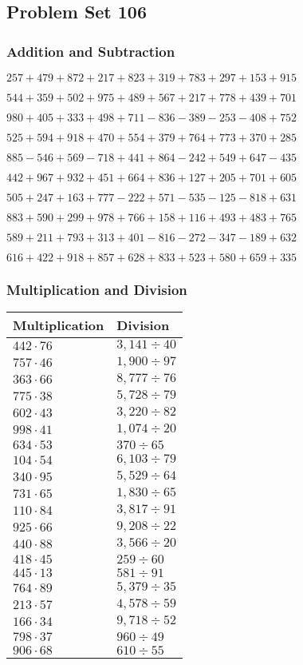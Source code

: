 \hypertarget{problem-set-106}{%
\subsection{Problem Set 106}\label{problem-set-106}}

\hypertarget{addition-and-subtraction}{%
\subsubsection{Addition and
Subtraction}\label{addition-and-subtraction}}

\(257 +479 +872 +217 +823 +319 +783 +297 +153 +915\)

\(544 +359 +502 +975 +489 +567 +217 +778 +439 +701\)

\(980 +405 +333 +498 +711 - 836 - 389 - 253 - 408 +752\)

\(525 +594 +918 +470 +554 +379 +764 +773 +370 +285\)

\(885 - 546 +569 - 718 +441 +864 - 242 +549 +647 - 435\)

\(442 +967 +932 +451 +664 +836 +127 +205 +701 +605\)

\(505 +247 +163 +777 - 222 +571 - 535 - 125 - 818 +631\)

\(883 +590 +299 +978 +766 +158 +116 +493 +483 +765\)

\(589 +211 +793 +313 +401 - 816 - 272 - 347 - 189 +632\)

\(616 +422 +918 +857 +628 +833 +523 +580 +659 +335\)

\hypertarget{multiplication-and-division}{%
\subsubsection{Multiplication and
Division}\label{multiplication-and-division}}

\begin{longtable}[]{@{}ll@{}}
\toprule
Multiplication & Division\tabularnewline
\midrule
\endhead
\(442 \cdot 76\) & \(3,141÷40\)\tabularnewline
\(757 \cdot 46\) & \(1,900÷97\)\tabularnewline
\(363 \cdot 66\) & \(8,777÷76\)\tabularnewline
\(775 \cdot 38\) & \(5,728÷79\)\tabularnewline
\(602 \cdot 43\) & \(3,220÷82\)\tabularnewline
\(998 \cdot 41\) & \(1,074÷20\)\tabularnewline
\(634 \cdot 53\) & \(370÷65\)\tabularnewline
\(104 \cdot 54\) & \(6,103÷79\)\tabularnewline
\(340 \cdot 95\) & \(5,529÷64\)\tabularnewline
\(731 \cdot 65\) & \(1,830÷65\)\tabularnewline
\(110 \cdot 84\) & \(3,817÷91\)\tabularnewline
\(925 \cdot 66\) & \(9,208÷22\)\tabularnewline
\(440 \cdot 88\) & \(3,566÷20\)\tabularnewline
\(418 \cdot 45\) & \(259÷60\)\tabularnewline
\(445 \cdot 13\) & \(581÷91\)\tabularnewline
\(764 \cdot 89\) & \(5,379÷35\)\tabularnewline
\(213 \cdot 57\) & \(4,578÷59\)\tabularnewline
\(166 \cdot 34\) & \(9,718÷52\)\tabularnewline
\(798 \cdot 37\) & \(960÷49\)\tabularnewline
\(906 \cdot 68\) & \(610÷55\)\tabularnewline
\bottomrule
\end{longtable}
